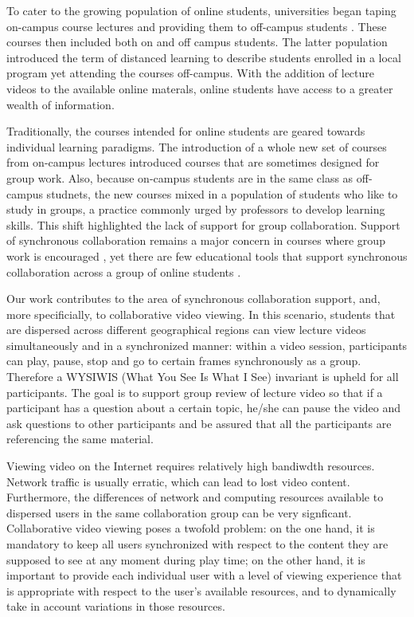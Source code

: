 \documentclass{sig-alternate}
\begin{document}
To cater to the growing population of online students, universities
began taping on-campus course lectures and providing them to
off-campus students \cite{CVN, STANDFORD}.  These courses then
included both on and off campus students.  The latter population
introduced the term of distanced learning to describe students
enrolled in a local program yet attending the courses off-campus.
With the addition of lecture videos to the available online materals,
online students have access to a greater wealth of information.

Traditionally, the courses intended for online students are geared
towards individual learning paradigms.  The introduction of a whole
new set of courses from on-campus lectures introduced courses that are
sometimes designed for group work.  Also, because on-campus students
are in the same class as off-campus studnets, the new courses mixed in
a population of students who like to study in groups, a practice
commonly urged by professors to develop learning skills.  This shift
highlighted the lack of support for group collaboration.  Support of
synchronous collaboration remains a major concern in courses where
group work is encouraged \cite{WELLS}, yet there are few educational
tools that support synchronous collaboration across a group of online
students \cite{BURGESS}.


Our work contributes to the area of synchronous collaboration support,
and, more specificially, to collaborative video viewing.  In this
scenario, students that are dispersed across different geographical
regions can view lecture videos simultaneously and in a synchronized
manner: within a video session, participants can play, pause, stop and
go to certain frames synchronously as a group.  Therefore a WYSIWIS
(What You See Is What I See) invariant is upheld for all participants.
The goal is to support group review of lecture video so that if a
participant has a question about a certain topic, he/she can pause the
video and ask questions to other participants and be assured that all
the participants are referencing the same material.

Viewing video on the Internet requires relatively high bandiwdth
resources.  Network traffic is usually erratic, which can lead to lost
video content.  Furthermore, the differences of network and computing
resources available to dispersed users in the same collaboration group
can be very signficant.  Collaborative video viewing poses a twofold
problem: on the one hand, it is mandatory to keep all users
synchronized with respect to the content they are supposed to see at
any moment during play time; on the other hand, it is important to
provide each individual user with a level of viewing experience that
is appropriate with respect to the user's available resources, and to
dynamically take in account variations in those resources.
\end{document}
